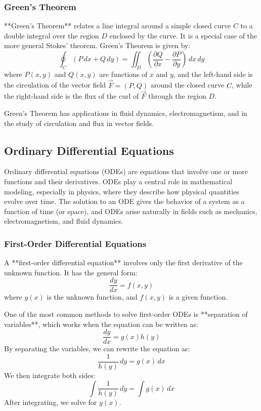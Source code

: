 \documentclass{article}
\begin{document}
\subsubsection*{Green's Theorem}

**Green’s Theorem** relates a line integral around a simple closed curve \( C \) to a double integral over the region \( D \) enclosed by the curve. It is a special case of the more general Stokes' theorem. Green’s Theorem is given by:
\[
\oint_C (P \, dx + Q \, dy) = \iint_D \left( \frac{\partial Q}{\partial x} - \frac{\partial P}{\partial y} \right) \, dx \, dy
\]
where \( P(x, y) \) and \( Q(x, y) \) are functions of \( x \) and \( y \), and the left-hand side is the circulation of the vector field \( \vec{F} = (P, Q) \) around the closed curve \( C \), while the right-hand side is the flux of the curl of \( \vec{F} \) through the region \( D \).

Green’s Theorem has applications in fluid dynamics, electromagnetism, and in the study of circulation and flux in vector fields.

\subsection{Ordinary Differential Equations}

Ordinary differential equations (ODEs) are equations that involve one or more functions and their derivatives. ODEs play a central role in mathematical modeling, especially in physics, where they describe how physical quantities evolve over time. The solution to an ODE gives the behavior of a system as a function of time (or space), and ODEs arise naturally in fields such as mechanics, electromagnetism, and fluid dynamics.

\subsubsection*{First-Order Differential Equations}

A **first-order differential equation** involves only the first derivative of the unknown function. It has the general form:
\[
\frac{dy}{dx} = f(x, y)
\]
where \( y(x) \) is the unknown function, and \( f(x, y) \) is a given function.

One of the most common methods to solve first-order ODEs is **separation of variables**, which works when the equation can be written as:
\[
\frac{dy}{dx} = g(x) h(y)
\]
By separating the variables, we can rewrite the equation as:
\[
\frac{1}{h(y)} \, dy = g(x) \, dx
\]
We then integrate both sides:
\[
\int \frac{1}{h(y)} \, dy = \int g(x) \, dx
\]
After integrating, we solve for \( y(x) \).
\end{document}
